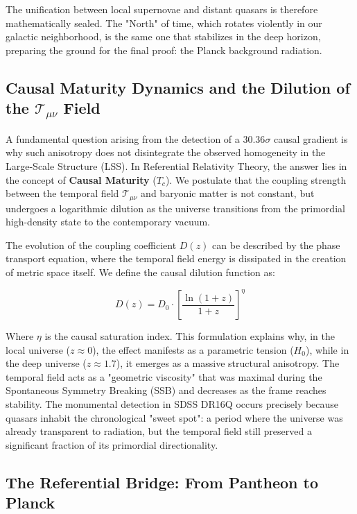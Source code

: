\documentclass[12pt, a4paper]{article}
\begin{document}
The unification between local supernovae and distant quasars is therefore mathematically sealed. The "North" of time, which rotates violently in our galactic neighborhood, is the same one that stabilizes in the deep horizon, preparing the ground for the final proof: the Planck background radiation.

\subsection{Causal Maturity Dynamics and the Dilution of the \texorpdfstring{$\mathcal{T}_{\mu\nu}$}{T\_munu} Field}

A fundamental question arising from the detection of a $30.36\sigma$ causal gradient is why such anisotropy does not disintegrate the observed homogeneity in the Large-Scale Structure (LSS). In Referential Relativity Theory, the answer lies in the concept of \textbf{Causal Maturity} ($T_c$). We postulate that the coupling strength between the temporal field $\mathcal{T}_{\mu\nu}$ and baryonic matter is not constant, but undergoes a logarithmic dilution as the universe transitions from the primordial high-density state to the contemporary vacuum.

The evolution of the coupling coefficient $D(z)$ can be described by the phase transport equation, where the temporal field energy is dissipated in the creation of metric space itself. We define the causal dilution function as:

\begin{equation}
D(z) = D_0 \cdot \left[ \frac{\ln(1+z)}{1+z} \right]^\eta
\end{equation}

Where $\eta$ is the causal saturation index. This formulation explains why, in the local universe ($z \approx 0$), the effect manifests as a parametric tension ($H_0$), while in the deep universe ($z \approx 1.7$), it emerges as a massive structural anisotropy. The temporal field acts as a "geometric viscosity" that was maximal during the Spontaneous Symmetry Breaking (SSB) and decreases as the frame reaches stability. The monumental detection in SDSS DR16Q occurs precisely because quasars inhabit the chronological "sweet spot": a period where the universe was already transparent to radiation, but the temporal field still preserved a significant fraction of its primordial directionality.

\subsection{The Referential Bridge: From Pantheon to Planck}
\end{document}
